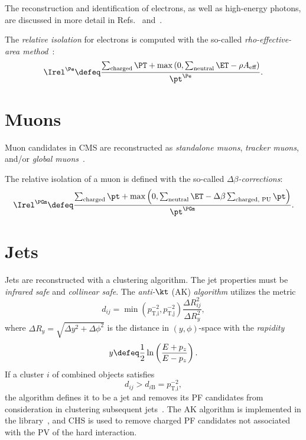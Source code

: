 The reconstruction and identification of electrons, as well as high-energy photons, are discussed in more detail in Refs.~\cite{CMS_electron} and~\cite{CMS_electron_2021}.

The \emph{relative isolation} for electrons is computed with the so-called \emph{rho-effective-area method}~\cite{PU_substraction}:
\begin{equation} \label{eq:iso_ele}
  \Irel^{\Pe} \defeq
    \frac{\sum_\text{charged} \PT + \max\left( 0, \sum_\text{neutral} \ET
                                  - \rho A_\text{eff} \right )}{\pt^{\Pe}}. 
\end{equation}


\section{Muons} \label{sec:muon}
Muon candidates in CMS are reconstructed as \emph{standalone muons}, \emph{tracker muons}, and/or \emph{global muons}~\cite{CMS_muon_2018}.

The relative isolation of a muon is defined with the so-called \emph{$\Delta\beta$-corrections}:
\begin{equation}\label{eq:iso_mu}
  \Irel^{\PGm} \defeq
    \frac{\sum_\text{charged} \pt + \max\left( 0, \sum_\text{neutral} \ET
                                  - \Delta\beta \sum_\text{charged, PU} \pt \right )}{\pt^{\PGm}}.
\end{equation}



\section{Jets}\label{sec:jets}

Jets are reconstructed with a clustering algorithm.
The jet properties must be \emph{infrared safe} and \emph{collinear safe}.
The \emph{anti-$\kt$} (AK) \emph{algorithm} utilizes the metric
\begin{equation} \label{eq:antikT}
  d_{ij} = \min\left(p_\text{T,i}^{-2},p_\text{T,j}^{-2}\right)\frac{\Delta R^2_{ij}}{\Delta R_y^2},
\end{equation}
where $\Delta R_y=\sqrt{\Delta y^2+\Delta\phi^2}$ is the distance in $(y,\phi)$-space with the \emph{rapidity}
\begin{equation} \label{eq:rapidity}
  y \defeq \frac{1}{2}\ln\left(\frac{E+p_z}{E-p_z}\right).
\end{equation}
If a cluster $i$ of combined objects satisfies
\begin{equation} \label{eq:antikT_cut}
  d_{ij} > d_{i\text{B}} = p_\text{T,i}^{-2},
\end{equation}
the algorithm defines it to be a jet and removes its PF candidates from consideration in clustering subsequent jets~\cite{PF2017,antikT}.
The AK algorithm is implemented in the \FASTJET library~\cite{fastjet1,fastjet2}, and CHS is used to remove charged PF candidates not associated with the PV of the hard interaction.

